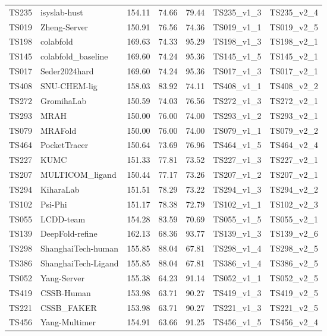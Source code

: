 \begin{longtable}{lllllll}
TS235 & isyslab-hust & 154.11 & 74.66 & 79.44 & TS235\_v1\_3 & TS235\_v2\_4 \\ 
TS019 & Zheng-Server & 150.91 & 76.56 & 74.36 & TS019\_v1\_1 & TS019\_v2\_5 \\ 
TS198 & colabfold & 169.63 & 74.33 & 95.29 & TS198\_v1\_3 & TS198\_v2\_1 \\ 
TS145 & colabfold\_baseline & 169.60 & 74.24 & 95.36 & TS145\_v1\_5 & TS145\_v2\_1 \\ 
TS017 & Seder2024hard & 169.60 & 74.24 & 95.36 & TS017\_v1\_3 & TS017\_v2\_1 \\ 
TS408 & SNU-CHEM-lig & 158.03 & 83.92 & 74.11 & TS408\_v1\_1 & TS408\_v2\_2 \\ 
TS272 & GromihaLab & 150.59 & 74.03 & 76.56 & TS272\_v1\_3 & TS272\_v2\_1 \\ 
TS293 & MRAH & 150.00 & 76.00 & 74.00 & TS293\_v1\_2 & TS293\_v2\_1 \\ 
TS079 & MRAFold & 150.00 & 76.00 & 74.00 & TS079\_v1\_1 & TS079\_v2\_2 \\ 
TS464 & PocketTracer & 150.64 & 73.69 & 76.96 & TS464\_v1\_5 & TS464\_v2\_4 \\ 
TS227 & KUMC & 151.33 & 77.81 & 73.52 & TS227\_v1\_3 & TS227\_v2\_1 \\ 
TS207 & MULTICOM\_ligand & 150.44 & 77.17 & 73.26 & TS207\_v1\_2 & TS207\_v2\_1 \\ 
TS294 & KiharaLab & 151.51 & 78.29 & 73.22 & TS294\_v1\_3 & TS294\_v2\_2 \\ 
TS102 & Psi-Phi & 151.17 & 78.38 & 72.79 & TS102\_v1\_1 & TS102\_v2\_3 \\ 
TS055 & LCDD-team & 154.28 & 83.59 & 70.69 & TS055\_v1\_5 & TS055\_v2\_1 \\ 
TS139 & DeepFold-refine & 162.13 & 68.36 & 93.77 & TS139\_v1\_3 & TS139\_v2\_6 \\ 
TS298 & ShanghaiTech-human & 155.85 & 88.04 & 67.81 & TS298\_v1\_4 & TS298\_v2\_5 \\ 
TS386 & ShanghaiTech-Ligand & 155.85 & 88.04 & 67.81 & TS386\_v1\_4 & TS386\_v2\_5 \\ 
TS052 & Yang-Server & 155.38 & 64.23 & 91.14 & TS052\_v1\_1 & TS052\_v2\_5 \\ 
TS419 & CSSB-Human & 153.98 & 63.71 & 90.27 & TS419\_v1\_3 & TS419\_v2\_5 \\ 
TS221 & CSSB\_FAKER & 153.98 & 63.71 & 90.27 & TS221\_v1\_3 & TS221\_v2\_5 \\ 
TS456 & Yang-Multimer & 154.91 & 63.66 & 91.25 & TS456\_v1\_5 & TS456\_v2\_4 \\ 

\end{longtable}
